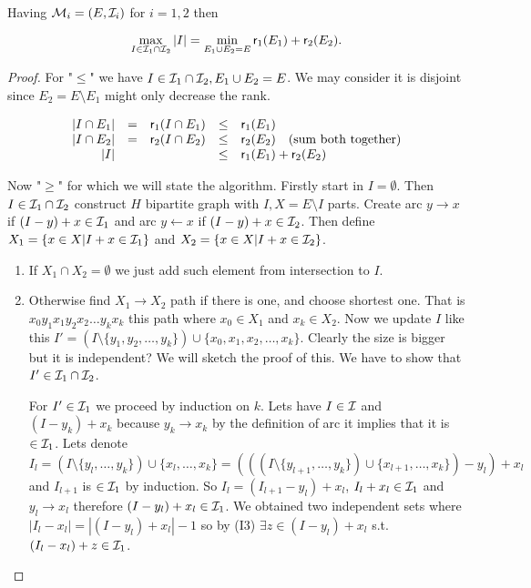 \begin{thm}
	Having $\mathcal{M}_i = (E, \mathcal{I}_i)$ for $i = 1,2$ then
	
	$$
	\max_{I \in \mathcal{I}_1 \cap \mathcal{I}_2} |I| = \min_{E_1 \cup E_2 = E} \operatorname{\textsf{r}}_1(E_1) + \operatorname{\textsf{r}}_2(E_2).
	$$
\end{thm}

\begin{proof}
	For "$\leq$" we have $I \in \mathcal{I}_1 \cap \mathcal{I}_2, E_1 \cup E_2 = E$. We may consider it is disjoint since $E_2 = E \setminus E_1$ might only decrease the rank.
	
	$$
	\begin{array}{r c c c l}
		|I \cap E_1| & = & \operatorname{\textsf{r}}_1 (I \cap E_1) & \leq & \operatorname{\textsf{r}}_1(E_1) \\
		|I \cap E_2| & = & \operatorname{\textsf{r}}_2 (I \cap E_2) & \leq & \operatorname{\textsf{r}}_2(E_2) \quad \text{(sum both together)}\\
		|I| & & & \leq & \operatorname{\textsf{r}}_1(E_1) + \operatorname{\textsf{r}}_2(E_2) \\
	\end{array}
	$$
	
	Now "$\geq$" for which we will state the algorithm. Firstly start in $I = \emptyset$. Then $I \in \mathcal{I}_1 \cap \mathcal{I}_2$ construct $H$ bipartite graph with $I, X = E \setminus I$ parts. Create arc $y \to x$ if $(I - y) + x \in \mathcal{I}_1$ and arc $y \leftarrow x$ if $(I - y) + x \in \mathcal{I}_2$. Then define $X_1 = \{x \in X | I + x \in \mathcal{I}_1\}$ and $X_2 = \{x \in X | I + x \in \mathcal{I}_2\}$.
	
	\begin{enumerate}
		\item If $X_1 \cap X_2 = \emptyset$ we just add such element from intersection to $I$.
		\item Otherwise find $X_1 \to X_2$ path if there is one, and choose shortest one. That is $x_0 y_1 x_1 y_2 x_2 \dots y_k x_k$ this path where $x_0 \in X_1$ and $x_k \in X_2$. Now we update $I$ like this $I' = (I \setminus \{y_1, y_2, \dots, y_k\}) \cup \{x_0, x_1, x_2, \dots, x_k\}$. Clearly the size is bigger but it is independent? We will sketch the proof of this. We have to show that $I' \in \mathcal{I}_1 \cap \mathcal{I}_2$.
		
		For $I' \in \mathcal{I}_1$ we proceed by induction on $k$. Lets have $I \in \mathcal{I}$ and $(I - y_k) + x_k$ because $y_k \to x_k$ by the definition of arc it implies that it is $\in \mathcal{I}_1$. Lets denote $I_l = (I \setminus \{y_l, \dots, y_k\}) \cup \{x_l, \dots, x_k\} = (((I \setminus \{y_{l+1}, \dots, y_k\}) \cup \{x_{l+1}, \dots, x_k\}) - y_l) + x_l$ and $I_{l+1}$ is $\in \mathcal{I}_1$ by induction. So $I_l = (I_{l+1} - y_l) + x_l$, $I_l + x_l \in \mathcal{I}_1$ and $y_l \to x_l$ therefore $(I - y_l) + x_l \in \mathcal{I}_1$. We obtained two independent sets where $|I_l - x_l| = |(I - y_l) + x_l| - 1$ so by (I3) $\exists z \in (I - y_l) + x_l$ s.t. $(I_l - x_l) + z \in \mathcal{I}_1$.
		

\end{enumerate}
\end{proof}
